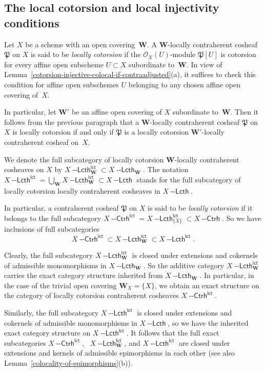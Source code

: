 \documentclass[12pt,a4paper]{amsart}
\newcommand{\+}{\nobreakdash-}
\renewcommand{\:}{\colon}
\newcommand{\Ctrh}{{\operatorname{\mathsf{--Ctrh}}}}
\newcommand{\Lcth}{{\operatorname{\mathsf{--Lcth}}}}
\newcommand{\lct}{\mathsf{lct}}
\newcommand{\bW}{\mathbf W}
\newcommand{\cO}{\mathcal O}
\newcommand{\fP}{\mathfrak P}
\theoremstyle{plain}
\theoremstyle{definition}
\begin{document}
\subsection{The local cotorsion and local injectivity conditions}
\label{lct-lin-subsecn}
 Let $X$ be a scheme with an open covering~$\bW$.
 A $\bW$\+locally contraherent cosheaf $\fP$ on $X$ is said to be
\emph{locally cotorsion} if the $\cO_X(U)$\+module $\fP[U]$ is
cotorsion for every affine open subscheme $U\subset X$ subordinate
to~$\bW$.
 In view of
Lemma~\ref{cotorsion-injective-colocal-if-contraadjusted}(a), it
suffices to check this condition for affine open subschemes $U$
belonging to any chosen affine open covering of~$X$.

 In particular, let $\bW'$ be an affine open covering of $X$
subordinate to~$\bW$.
 Then it follows from the previous paragraph that a $\bW$\+locally
contraherent cosheaf $\fP$ on $X$ is locally cotorsion if and only
if $\fP$ is a locally cotorsion $\bW'$\+locally contraherent
cosheaf on~$X$.

 We denote the full subcategory of locally cotorsion $\bW$\+locally
contraherent cosheaves on $X$ by $X\Lcth^\lct_\bW\subset X\Lcth_\bW$.
 The notation $X\Lcth^\lct=\bigcup_\bW X\Lcth^\lct_\bW\allowbreak
\subset X\Lcth$ stands for the full subcategory of locally cotorsion
locally contraherent cosheaves in $X\Lcth$.

 In particular, a contraherent cosheaf $\fP$ on $X$ is said to be
\emph{locally cotorsion} if it belongs to the full subcategory
$X\Ctrh^\lct=X\Lcth^\lct_{\{X\}}\subset X\Ctrh$.
 So we have inclusions of full subcategories
$$
  X\Ctrh^\lct\subset X\Lcth^\lct_\bW\subset X\Lcth^\lct.
$$

 Clearly, the full subcategory $X\Lcth^\lct_\bW$ is closed under
extensions and cokernels of admissible monomorphisms in $X\Lcth_\bW$.
 So the additive category $X\Lcth^\lct_\bW$ carries the exact
category structure inherited from $X\Lcth_\bW$.
 In particular, in the case of the trivial open covering
$\bW_X=\{X\}$, we obtain an exact structure on the category of
locally cotorsion contraherent cosheaves $X\Ctrh^\lct$.

 Similarly, the full subcategory $X\Lcth^\lct$ is closed under
extensions and cokernels of admissible monomorphisms in $X\Lcth$,
so we have the inherited exact category structure on $X\Lcth^\lct$.
 It follows that the full exact subcategories $X\Ctrh^\lct$, \
$X\Lcth^\lct_\bW$, and $X\Lcth^\lct$ are closed under extensions
and kernels of admissible epimorphisms in each other (see
also Lemma~\ref{colocality-of-epimorphisms}(b)).
\end{document}
